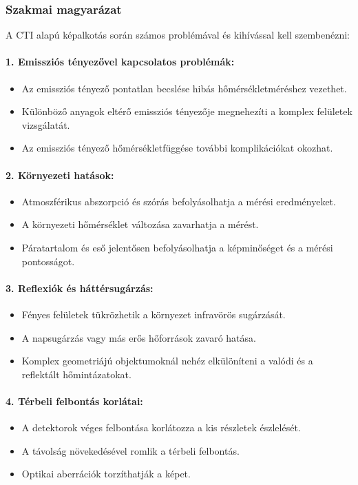\documentclass[a4paper,12pt]{article}
\begin{document}
\subsubsection{Szakmai magyarázat} A CTI alapú képalkotás során számos problémával és kihívással kell szembenézni:

\paragraph{1. Emissziós tényezővel kapcsolatos problémák:} \begin{itemize} \item Az emissziós tényező pontatlan becslése hibás hőmérsékletméréshez vezethet. \item Különböző anyagok eltérő emissziós tényezője megnehezíti a komplex felületek vizsgálatát. \item Az emissziós tényező hőmérsékletfüggése további komplikációkat okozhat. \end{itemize}

\paragraph{2. Környezeti hatások:} \begin{itemize} \item Atmoszférikus abszorpció és szórás befolyásolhatja a mérési eredményeket. \item A környezeti hőmérséklet változása zavarhatja a mérést. \item Páratartalom és eső jelentősen befolyásolhatja a képminőséget és a mérési pontosságot. \end{itemize}

\paragraph{3. Reflexiók és háttérsugárzás:} \begin{itemize} \item Fényes felületek tükrözhetik a környezet infravörös sugárzását. \item A napsugárzás vagy más erős hőforrások zavaró hatása. \item Komplex geometriájú objektumoknál nehéz elkülöníteni a valódi és a reflektált hőmintázatokat. \end{itemize}

\paragraph{4. Térbeli felbontás korlátai:} \begin{itemize} \item A detektorok véges felbontása korlátozza a kis részletek észlelését. \item A távolság növekedésével romlik a térbeli felbontás. \item Optikai aberrációk torzíthatják a képet. \end{itemize}
\end{document}
